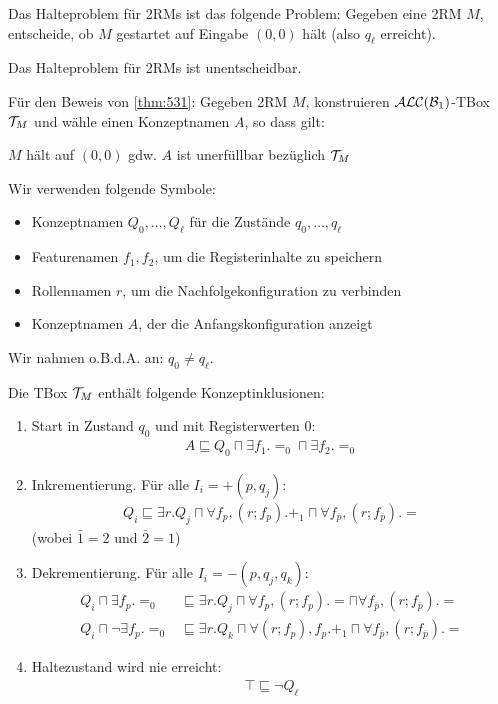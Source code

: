 \begin{definition}
    Das Halteproblem für 2RMs ist das folgende Problem: Gegeben eine 2RM $M$, entscheide, ob $M$ gestartet auf Eingabe $(0, 0)$ hält (also $q_\ell$ erreicht).
\end{definition}

\begin{theorem}[Minsky 1967]
    Das Halteproblem für 2RMs ist unentscheidbar.
\end{theorem}

Für den Beweis von \autoref{thm:531}:
Gegeben 2RM $M$,  konstruieren $\mathcal{A}\mathcal{L}\mathcal{C}(\mathcal{B}_1)$-TBox $\mathcal{T}_M$ und wähle einen Konzeptnamen $A$, so dass gilt:
\begin{center}
    $M$ hält auf $(0, 0)$ gdw. $A$ ist unerfüllbar bezüglich $\mathcal{T}_M$
\end{center}

Wir verwenden folgende Symbole:
\begin{itemize}
    \item Konzeptnamen $Q_0, \ldots, Q_\ell$ für die Zustände $q_0, \ldots, q_\ell$
    \item Featurenamen $f_1, f_2$, um die Registerinhalte zu speichern
    \item Rollennamen $r$, um die Nachfolgekonfiguration zu verbinden
    \item Konzeptnamen $A$, der die Anfangskonfiguration anzeigt
\end{itemize}
Wir nahmen o.B.d.A. an: $q_0 \neq q_\ell$.

Die TBox $\mathcal{T}_M$ enthält folgende Konzeptinklusionen:
\begin{enumerate}
    \item Start in Zustand $q_0$ und mit Registerwerten $0$:
        \begin{gather*}
            A \sqsubseteq Q_0 \sqcap \exists f_1.=_0 \sqcap \exists f_2.=_0
        \end{gather*}
    \item Inkrementierung. Für alle $I_i = +(p, q_j)$:
        \begin{gather*}
            Q_i \sqsubseteq \exists r.Q_j \sqcap \forall f_p, (r;f_p).+_1 \sqcap \forall f_{\bar{p}}, (r;f_{\bar{p}}).=
        \end{gather*}
        (wobei $\bar{1} = 2$ und $\bar{2} = 1$)
    \item Dekrementierung. Für alle $I_i = -(p, q_j, q_k)$: \begin{align*}
            Q_i \sqcap \exists f_p.=_0 &\sqsubseteq \exists r.Q_j \sqcap \forall f_p, (r;f_p).= \sqcap \forall f_{\bar{p}}, (r;f_{\bar{p}}).=\\
            Q_i \sqcap \neg\exists f_p.=_0 &\sqsubseteq \exists r.Q_k \sqcap \forall(r;f_p),f_p.+_1 \sqcap \forall f_{\bar{p}}, (r;f_{\bar{p}}).=
        \end{align*}
    \item Haltezustand wird nie erreicht:
        \begin{gather*}
            \top \sqsubseteq \neg Q_\ell
        \end{gather*}
\end{enumerate}

